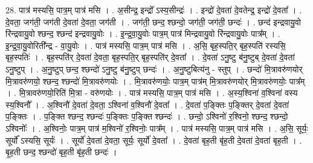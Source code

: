 \documentclass[17pt]{extarticle}
\begin{document}
28. पात्र॑ मस्यसि॒ पात्र॒म् पात्र॑ मसि । . अ॒सीन्द्र॒ इन्द्रो᳚ ऽस्य॒सीन्द्रः॑ । . इन्द्रो॑ दे॒वता॑ दे॒वतेन्द्र॒ इन्द्रो॑ दे॒वता᳚ । . दे॒वता॒ जग॑ती॒ जग॑ती दे॒वता॑ दे॒वता॒ जग॑ती । . जग॑ती॒ छन्द॒ श्छन्दो॒ जग॑ती॒ जग॑ती॒ छन्दः॑ । . छन्द॑ इन्द्रवायु॒वो रि॑न्द्रवायु॒वो श्छन्द॒ श्छन्द॑ इन्द्रवायु॒वोः । . इ॒न्द्र॒वा॒यु॒वोः पात्र॒म् पात्र॑ मिन्द्रवायु॒वो रि॑न्द्रवायु॒वोः पात्र᳚म् । . इ॒न्द्र॒वा॒यु॒वोरिती᳚न्द्र - वा॒यु॒वोः । . पात्र॑ मस्यसि॒ पात्र॒म् पात्र॑ मसि । . अ॒सि॒ बृह॒स्पति॒र् बृह॒स्पति॑ रस्यसि॒ बृह॒स्पतिः॑ । . बृह॒स्पति॑र् दे॒वता॑ दे॒वता॒ बृह॒स्पति॒र् बृह॒स्पति॑र् दे॒वता᳚ । . दे॒वता॑ ऽनु॒ष्टु ब॑नु॒ष्टुब् दे॒वता॑ दे॒वता॑ ऽनु॒ष्टुप् । . अ॒नु॒ष्टुप् छन्द॒ श्छन्दो॑ ऽनु॒ष्टु ब॑नु॒ष्टुप् छन्दः॑ । . अ॒नु॒ष्टुबित्य॑नु - स्तुप् । . छन्दो॑ मि॒त्रावरु॑णयोर् मि॒त्रावरु॑णयो॒ श्छन्द॒ श्छन्दो॑ मि॒त्रावरु॑णयोः । . मि॒त्रावरु॑णयोः॒ पात्र॒म् पात्र॑म् मि॒त्रावरु॑णयोर् मि॒त्रावरु॑णयोः॒ पात्र᳚म् । . मि॒त्रावरु॑णयो॒रिति॑ मि॒त्रा - वरु॑णयोः । . पात्र॑ मस्यसि॒ पात्र॒म् पात्र॑ मसि । . अ॒स्य॒श्विना॑ व॒श्विना॑ वस्य स्य॒श्विनौ᳚ । . अ॒श्विनौ॑ दे॒वता॑ दे॒वता॒ ऽश्विना॑ व॒श्विनौ॑ दे॒वता᳚ । . दे॒वता॑ प॒ङ्क्तिः प॒ङ्क्तिर् दे॒वता॑ दे॒वता॑ प॒ङ्क्तिः । . प॒ङ्क्ति श्छन्द॒ श्छन्दः॑ प॒ङ्क्तिः प॒ङ्क्ति श्छन्दः॑ । . छन्दो॒ ऽश्विनो॑ र॒श्विनो॒ श्छन्द॒ श्छन्दो॒ ऽश्विनोः᳚ । . अ॒श्विनोः॒ पात्र॒म् पात्र॑ म॒श्विनो॑ र॒श्विनोः॒ पात्र᳚म् । . पात्र॑ मस्यसि॒ पात्र॒म् पात्र॑ मसि । . अ॒सि॒ सूर्यः॒ सूर्यो᳚ ऽस्यसि॒ सूर्यः॑ । . सूर्यो॑ दे॒वता॑ दे॒वता॒ सूर्यः॒ सूर्यो॑ दे॒वता᳚ । . दे॒वता॑ बृह॒ती बृ॑ह॒ती दे॒वता॑ दे॒वता॑ बृह॒ती । . बृ॒ह॒ती छन्द॒ श्छन्दो॑ बृह॒ती बृ॑ह॒ती छन्दः॑ । \newline
\end{document}

